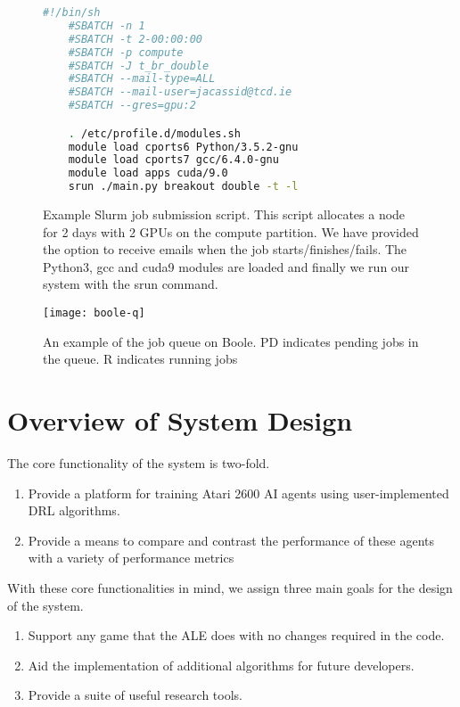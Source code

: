 \begin{figure}[H]
	\centering
	\begin{lstlisting}[language=bash]
    #!/bin/sh
    #SBATCH -n 1
    #SBATCH -t 2-00:00:00
    #SBATCH -p compute
    #SBATCH -J t_br_double
    #SBATCH --mail-type=ALL
    #SBATCH --mail-user=jacassid@tcd.ie
    #SBATCH --gres=gpu:2

    . /etc/profile.d/modules.sh
    module load cports6 Python/3.5.2-gnu
    module load cports7 gcc/6.4.0-gnu
    module load apps cuda/9.0
    srun ./main.py breakout double -t -l
    \end{lstlisting}
	\caption{Example Slurm job submission script. This script allocates a node for 2 days with 2 GPUs on the compute partition. We have provided the option to receive emails when the job starts/finishes/fails. The Python3, gcc and cuda9 modules are loaded and finally we run our system with the srun command.}
\end{figure}

\begin{figure}[h]
	\centering
	\texttt{[image: boole-q]}
	\caption{An example of the job queue on Boole. PD indicates pending jobs in the queue. R indicates running jobs}
	\label{fig:boolq}
\end{figure}

\section{Overview of System Design} \label{sec:sys_overview}
The core functionality of the system is two-fold.
\begin{enumerate}
	\item Provide a platform for training Atari 2600 AI agents using user-implemented DRL algorithms.
	\item Provide a means to compare and contrast the performance of these agents with a variety of performance metrics
\end{enumerate}

With these core functionalities in mind, we assign three main goals for the design of the system.
\begin{enumerate}
	\item Support any game that the ALE does with no changes required in the code.
	\item Aid the implementation of additional algorithms for future developers.
	\item Provide a suite of useful research tools.
\end{enumerate}
